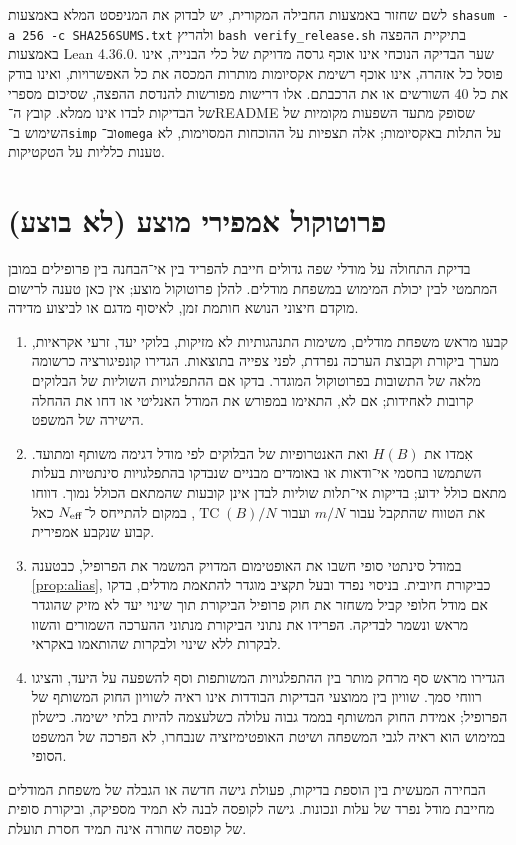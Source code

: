 \documentclass[11pt,a4paper]{article}
\theoremstyle{definition}
\theoremstyle{remark}
\newcommand{\TC}{\operatorname{TC}}
\newcommand{\EN}[1]{\textenglish{#1}}
\begin{document}
לשם שחזור באמצעות החבילה המקורית, יש לבדוק את המניפסט המלא באמצעות \EN{\texttt{shasum -a 256 -c SHA256SUMS.txt}} ולהריץ \EN{\texttt{bash verify\_release.sh}} בתיקיית ההפצה באמצעות \EN{Lean 4.36.0}. שער הבדיקה הנוכחי אינו אוכף גרסה מדויקת של כלי הבנייה, אינו פוסל כל אזהרה, אינו אוכף רשימת אקסיומות מותרות המכסה את כל האפשרויות, ואינו בודק את כל 40 השורשים או את הרכבתם. אלו דרישות מפורשות להנדסת ההפצה, שסיכום מספרי של הבדיקות לבדו אינו ממלא. קובץ ה־\EN{README} שסופק מתעד השפעות מקומיות של השימוש ב־\EN{\texttt{simp}} וב־\EN{\texttt{omega}} על התלות באקסיומות; אלה תצפיות על ההוכחות המסוימות, לא טענות כלליות על הטקטיקות.

\section{פרוטוקול אמפירי מוצע (לא בוצע)}
בדיקת התחולה על מודלי שפה גדולים חייבת להפריד בין אי־הבחנה בין פרופילים במובן המתמטי לבין יכולת המימוש במשפחת מודלים. להלן פרוטוקול מוצע; אין כאן טענה לרישום מוקדם חיצוני הנושא חותמת זמן, לאיסוף מדגם או לביצוע מדידה.
\begin{enumerate}
\item קבעו מראש משפחת מודלים, משימות התנהגותיות לא מזיקות, בלוקי יעד, זרעי אקראיות, מערך ביקורת וקבוצת הערכה נפרדת, לפני צפייה בתוצאות. הגדירו קונפיגורציה כרשומה מלאה של התשובות בפרוטוקול המוגדר. בדקו אם ההתפלגויות השוליות של הבלוקים קרובות לאחידות; אם לא, התאימו במפורש את המודל האנליטי או דחו את ההחלה הישירה של המשפט.
\item אִמדו את $H(B)$ ואת האנטרופיות של הבלוקים לפי מודל דגימה משותף ומתועד. השתמשו בחסמי אי־ודאות או באומדים מבניים שנבדקו בהתפלגויות סינתטיות בעלות מתאם כולל ידוע; בדיקות אי־תלות שוליות לבדן אינן קובעות שהמתאם הכולל נמוך. דווחו את הטווח שהתקבל עבור $m/N$ ועבור $\TC(B)/N$, במקום להתייחס ל־$N_{\rm eff}$ כאל קבוע שנקבע אמפירית.
\item במודל סינתטי סופי חשבו את האופטימום המדויק המשמר את הפרופיל, כבטענה \ref{prop:alias}, כביקורת חיובית. בניסוי נפרד ובעל תקציב מוגדר להתאמת מודלים, בדקו אם מודל חלופי קביל משחזר את חוק פרופיל הביקורת תוך שינוי יעד לא מזיק שהוגדר מראש ונשמר לבדיקה. הפרידו את נתוני הביקורת מנתוני ההערכה השמורים והשוו לבקרות ללא שינוי ולבקרות שהותאמו באקראי.
\item הגדירו מראש סף מרחק מותר בין ההתפלגויות המשותפות וסף להשפעה על היעד, והציגו רווחי סמך. שוויון בין ממוצעי הבדיקות הבודדות אינו ראיה לשוויון החוק המשותף של הפרופיל; אמידת החוק המשותף בממד גבוה עלולה כשלעצמה להיות בלתי ישימה. כישלון במימוש הוא ראיה לגבי המשפחה ושיטת האופטימיזציה שנבחרו, לא הפרכה של המשפט הסופי.
\end{enumerate}
הבחירה המעשית בין הוספת בדיקות, פעולת גישה חדשה או הגבלה של משפחת המודלים מחייבת מודל נפרד של עלות ונכונות. גישה לקופסה לבנה לא תמיד מספיקה, וביקורת סופית של קופסה שחורה אינה תמיד חסרת תועלת.
\end{document}
